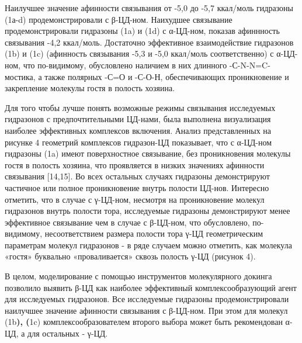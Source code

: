 \begin{multicols}{2}
Наилучшее значение афинности связывания от -5,0 до -5,7 ккал/моль
гидразоны (1а-d) продемонстрировали с β-ЦД-ном. Наихудшее связывание
продемонстрировали гидразоны (1a) и (1d) с α-ЦД-ном,
показав афиннность связывания -4,2 ккал/моль. Достаточно эффективное
взаимодействие гидразонов (1b) и (1c) (афинность связывания
-5,3 и -5,0 ккал/моль соответственно) с α-ЦД-ном, что по-видимому,
обусловлено наличием в них длинного -С-N-N=C- мостика, а также полярных
-С=О и -С-О-Н, обеспечивающих проникновение и закрепление молекулы гостя
в полость хозяина.

Для того чтобы лучше понять возможные режимы связывания исследуемых
гидразонов с предпочтительными ЦД-нами, была выполнена визуализация
наиболее эффективных комплексов включения. Анализ представленных на
рисунке 4 геометрий комплексов гидразон-ЦД показывает, что с α-ЦД-ном
гидразоны (1a) имеют поверхностное связывание, без проникновения
молекулы гостя в полость хозяина, что проявляется в низких значениях
афинности связывания {[}14,15{]}. Во всех остальных случаях гидразоны
демонстрируют частичное или полное проникновение внутрь полости ЦД-нов.
Интересно отметить, что в случае с γ-ЦД-ном, несмотря на проникновение
молекул гидразонов внутрь полости тора, исследуемые гидразоны
демонстрируют менее эффективное связывание чем в случае с β-ЦД-ном, что
обусловлено, по-видимому, несоответствием размера полости тора γ-ЦД
геометрическим параметрам молекул гидразонов - в ряде случаем можно
отметить, как молекула «гостя» буквально «проваливается» сквозь полость
γ-ЦД (рисунок 4).

В целом, моделирование с помощью инструментов молекулярного докинга
позволило выявить β-ЦД как наиболее эффективный комплексообразующий
агент для исследуемых гидразонов. Все исследуемые гидразоны
продемонстрировали наилучшее значение афинности связывания с β-ЦД-ном.
При этом для молекул (1b{\bfseries ), (}1c) комплексообразователем
второго выбора может быть рекомендован α-ЦД, а для остальных - γ-ЦД.


\end{multicols}
